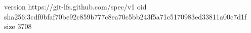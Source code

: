 version https://git-lfs.github.com/spec/v1
oid sha256:3cdf0bfaf70be92c859b777c8ea70c5bb243f5a71c5170983ed33811a00c7d1f
size 3708
